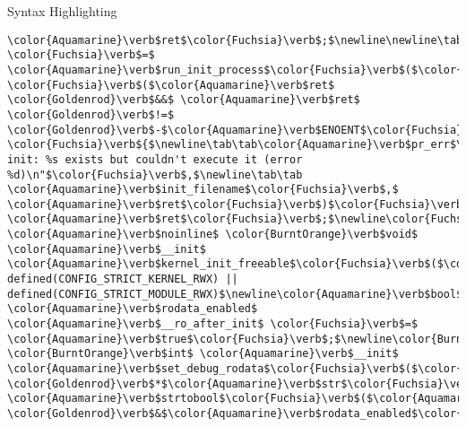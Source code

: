 \begin{frame}{Syntax Highlighting}
\begin{verbatim}
\color{Aquamarine}\verb$ret$\color{Fuchsia}\verb$;$\newline\newline\tab\color{Aquamarine}\verb$ret$ \color{Fuchsia}\verb$=$ \color{Aquamarine}\verb$run_init_process$\color{Fuchsia}\verb$($\color{Aquamarine}\verb$init_filename$\color{Fuchsia}\verb$)$\color{Fuchsia}\verb$;$\newline\newline\tab\color{BurntOrange}\verb$if$ \color{Fuchsia}\verb$($\color{Aquamarine}\verb$ret$ \color{Goldenrod}\verb$&&$ \color{Aquamarine}\verb$ret$ \color{Goldenrod}\verb$!=$ \color{Goldenrod}\verb$-$\color{Aquamarine}\verb$ENOENT$\color{Fuchsia}\verb$)$ \color{Fuchsia}\verb${$\newline\tab\tab\color{Aquamarine}\verb$pr_err$\color{Fuchsia}\verb$($\color{Emerald}\verb$"Starting init: %s exists but couldn't execute it (error %d)\n"$\color{Fuchsia}\verb$,$\newline\tab\tab       \color{Aquamarine}\verb$init_filename$\color{Fuchsia}\verb$,$ \color{Aquamarine}\verb$ret$\color{Fuchsia}\verb$)$\color{Fuchsia}\verb$;$\newline\tab\color{Fuchsia}\verb$}$\newline\newline\tab\color{BurntOrange}\verb$return$ \color{Aquamarine}\verb$ret$\color{Fuchsia}\verb$;$\newline\color{Fuchsia}\verb$}$\newline\newline\color{BurntOrange}\verb$static$ \color{Aquamarine}\verb$noinline$ \color{BurntOrange}\verb$void$ \color{Aquamarine}\verb$__init$ \color{Aquamarine}\verb$kernel_init_freeable$\color{Fuchsia}\verb$($\color{BurntOrange}\verb$void$\color{Fuchsia}\verb$)$\color{Fuchsia}\verb$;$\newline\newline\color{Gray}\verb$#if defined(CONFIG_STRICT_KERNEL_RWX) || defined(CONFIG_STRICT_MODULE_RWX)$\newline\color{Aquamarine}\verb$bool$ \color{Aquamarine}\verb$rodata_enabled$ \color{Aquamarine}\verb$__ro_after_init$ \color{Fuchsia}\verb$=$ \color{Aquamarine}\verb$true$\color{Fuchsia}\verb$;$\newline\color{BurntOrange}\verb$static$ \color{BurntOrange}\verb$int$ \color{Aquamarine}\verb$__init$ \color{Aquamarine}\verb$set_debug_rodata$\color{Fuchsia}\verb$($\color{BurntOrange}\verb$char$ \color{Goldenrod}\verb$*$\color{Aquamarine}\verb$str$\color{Fuchsia}\verb$)$\newline\color{Fuchsia}\verb${$\newline\tab\color{BurntOrange}\verb$return$ \color{Aquamarine}\verb$strtobool$\color{Fuchsia}\verb$($\color{Aquamarine}\verb$str$\color{Fuchsia}\verb$,$ \color{Goldenrod}\verb$&$\color{Aquamarine}\verb$rodata_enabled$\color{Fuchsia}\verb$)$\color{Fuchsia}\verb$;$\newline\color{Fuchsia}\verb$}$\newline\color{Aquamarine}\verb$__setup$\color{Fuchsia}\verb$($\color{Emerald}\verb$"rodata="$\color{Fuchsia}\verb$,$ 
\end{verbatim}
\end{frame}
